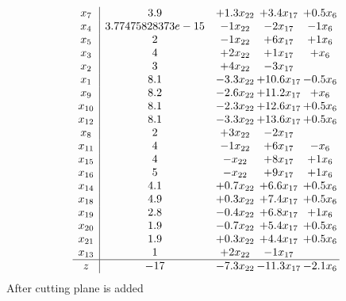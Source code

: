 \documentclass[11pt]{article}
\begin{document}
\[\begin{array}{c| c c@{\hskip 2pt} c@{\hskip 2pt} c@{\hskip 2pt} }
 x_{7}   &  3.9 & + 1.3 x_{22} & + 3.4 x_{17} & + 0.5 x_{6}\\
 x_{4}   &  3.77475828373e-15 & -1 x_{22} & -2 x_{17} & -1 x_{6}\\
 x_{5}   &  2 & -1 x_{22} & + 6 x_{17} & + 1 x_{6}\\
 x_{3}   &  4 & + 2 x_{22} & + 1 x_{17} & +  x_{6}\\
 x_{2}   &  3 & + 4 x_{22} & -3 x_{17} &   \\
 x_{1}   &  8.1 & -3.3 x_{22} & + 10.6 x_{17} & -0.5 x_{6}\\
 x_{9}   &  8.2 & -2.6 x_{22} & + 11.2 x_{17} & +  x_{6}\\
 x_{10}   &  8.1 & -2.3 x_{22} & + 12.6 x_{17} & + 0.5 x_{6}\\
 x_{12}   &  8.1 & -3.3 x_{22} & + 13.6 x_{17} & + 0.5 x_{6}\\
 x_{8}   &  2 & + 3 x_{22} & -2 x_{17} &   \\
 x_{11}   &  4 & -1 x_{22} & + 6 x_{17} & - x_{6}\\
 x_{15}   &  4 & - x_{22} & + 8 x_{17} & + 1 x_{6}\\
 x_{16}   &  5 & - x_{22} & + 9 x_{17} & + 1 x_{6}\\
 x_{14}   &  4.1 & + 0.7 x_{22} & + 6.6 x_{17} & + 0.5 x_{6}\\
 x_{18}   &  4.9 & + 0.3 x_{22} & + 7.4 x_{17} & + 0.5 x_{6}\\
 x_{19}   &  2.8 & -0.4 x_{22} & + 6.8 x_{17} & + 1 x_{6}\\
 x_{20}   &  1.9 & -0.7 x_{22} & + 5.4 x_{17} & + 0.5 x_{6}\\
 x_{21}   &  1.9 & + 0.3 x_{22} & + 4.4 x_{17} & + 0.5 x_{6}\\
 x_{13}   &  1 & + 2 x_{22} & -1 x_{17} &   \\
\hline
z    &  -17 & -7.3 x_{22} & -11.3 x_{17} & -2.1 x_{6}\\
\end{array}\]
 After cutting plane is added 
\end{document}

